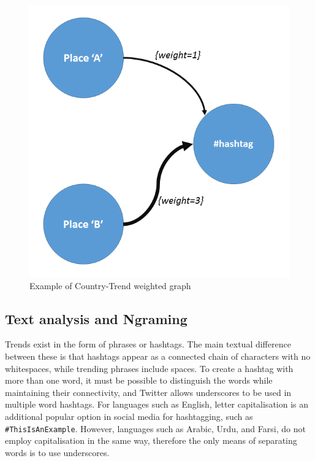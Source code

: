 \documentclass{comjnl}
\begin{document}
\begin{figure}[!ht] \centering
\includegraphics[width=\columnwidth]{images/w_graph.png}
\caption{Example of Country-Trend weighted graph}
\label{fig:w_graph}
\end{figure}


\subsection{Text analysis and Ngraming}

Trends exist in the form of phrases or hashtags. The main textual difference between these is that hashtags appear as a connected chain of characters with no whitespaces, while trending phrases include spaces. To create a hashtag with more than one word, it must be possible to distinguish the words while maintaining their connectivity, and Twitter allows underscores to be used in multiple word hashtags. For languages such as English, letter capitalisation is an additional popular option in social media for hashtagging, such as {\texttt{\#ThisIsAnExample}}. However, languages such as Arabic, Urdu, and Farsi, do not employ capitalisation in the same way, therefore the only means of separating words is to use underscores.
\end{document}
